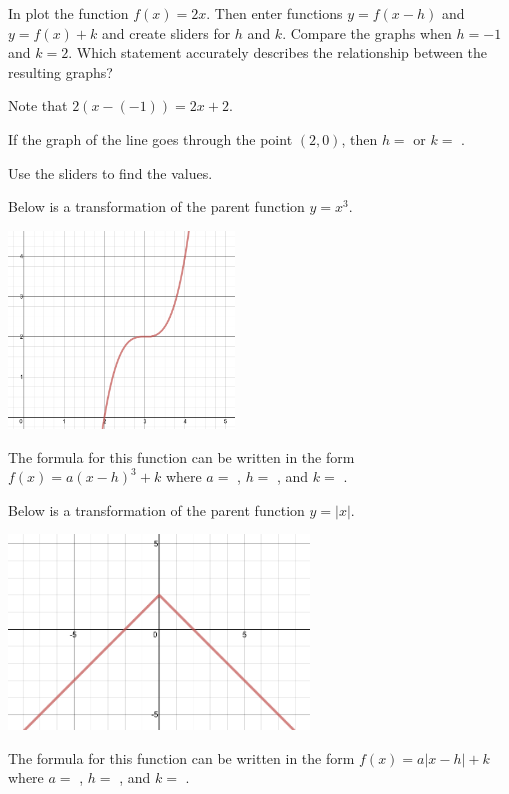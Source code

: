 \documentclass{ximera}
\begin{document}
\begin{question}
In  plot the function $f(x)=2x$. Then enter functions $y=f(x-h)$ and $y=f(x)+k$ and create sliders for $h$ and $k$. Compare the graphs when $h=-1$ and $k=2$. Which statement accurately describes the relationship between the resulting graphs?

    \begin{multipleChoice}
    \end{multipleChoice}
    \begin{hint}
    Note that $2(x-(-1))=2x+2$.
    \end{hint}
If the graph of the line goes through the point $(2,0)$, then $h=$  or $k=$ .  
	\begin{hint}
    Use the sliders to find the values. 
    \end{hint}

\end{question}

\begin{question}
Below is a transformation of the parent function $y=x^3$. 
\begin{image}
\includegraphics[width=6cm]{2_x-3_cubed+2.png}
\end{image}
The formula for this function can be written in the form $f(x)=a(x-h)^3+k$ where $a=$ , $h=$ , and $k=$ .
\end{question}

\begin{question}
Below is a transformation of the parent function $y=|x|$. 
\begin{image}
\includegraphics[width=8cm]{neg_x_+2.png}
\end{image}
The formula for this function can be written in the form $f(x)=a|x-h|+k$ where $a=$ , $h=$ , and $k=$ .
\end{question}
\end{document}
